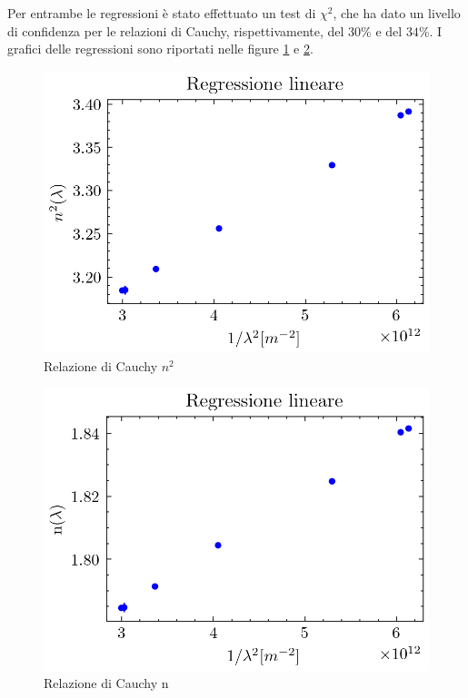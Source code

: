 \documentclass{article}
\begin{document}
        Per entrambe le regressioni è stato effettuato un test di $\chi^2$, che ha dato un livello di confidenza per le relazioni di Cauchy, rispettivamente, 
        del $30\%$ e del $34\%$. I grafici delle regressioni sono riportati nelle figure \ref{figure:Cauchy_1} e \ref{figure:Cauchy_2}. 

        \begin{figure} [H]

            \centering
            \includegraphics{../images/Cauchy_1.png}
            \caption{Relazione di Cauchy $n^2$}
            \label{figure:Cauchy_1}

        \end{figure}

        \begin{figure} [H]

            \centering
            \includegraphics{../images/Cauchy_2.png}
            \caption{Relazione di Cauchy n}
            \label{figure:Cauchy_2}

        \end{figure}
        
\end{document}

